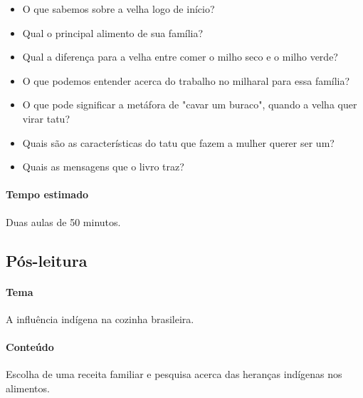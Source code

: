 \documentclass[11pt]{extarticle}
\begin{document}
\begin{itemize}

\item O que sabemos sobre a velha logo de início?

\item Qual o principal alimento de sua família?

\item Qual a diferença para a velha entre comer o milho seco e o milho verde?

\item O que podemos entender acerca do trabalho no milharal para essa família?

\item O que pode significar a metáfora de "cavar um buraco", quando a velha quer virar tatu?

\item Quais são as características do tatu que fazem a mulher querer ser um?

\item Quais as mensagens que o livro traz?

\end{itemize}


\paragraph{Tempo estimado} Duas aulas de 50 minutos.

\subsection{Pós-leitura}


\paragraph{Tema} A influência indígena na cozinha brasileira.

\paragraph{Conteúdo} Escolha de uma receita familiar e pesquisa acerca das heranças indígenas nos alimentos.
\end{document}

